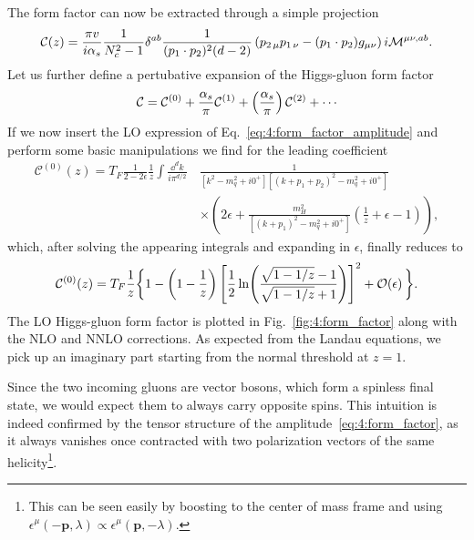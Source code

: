 The form factor can now be extracted through a simple projection
\begin{equation}
\mathcal{C}(z) = \frac{\pi v}{i \alpha_s} \frac{1}{N_c^2 - 1} \delta^{ab} \frac{1}{(p_1 \cdot p_2)^2 (d - 2)} \left(p_{2\,\mu} p_{1\,\nu} - (p_1 \cdot p_2) g_{\mu\nu} \right) i \mathcal{M}^{\mu \nu, ab}.
\end{equation}
Let us further define a pertubative expansion of the Higgs-gluon form factor
\begin{equation}
\mathcal{C} = \mathcal{C}^{(0)} + \frac{\alphas}{\pi} \mathcal{C}^{(1)} + \left( \frac{\alphas}{\pi} \right) \mathcal{C}^{(2)} + \cdots
\label{eq:4:form_factor_expansion}
\end{equation}
If we now insert the \acs{LO} expression of Eq.~\eqref{eq:4:form_factor_amplitude} and perform some basic manipulations we find for the leading coefficient
\begin{equation}
\begin{split}
\mathcal{C}^{(0)} (z) = T_F \frac{1}{2 - 2 \epsilon} \frac{1}{z} \int \frac{\dd^d k}{i \pi^{d/2}} \,&\frac{1}{[k^2 - m_q^2 + i0^+][(k + p_1 + p_2)^2 - m_q^2 + i0^+]} \\
& \times \left( 2 \epsilon + \frac{m_H^2}{[(k + p_1)^2 - m_q^2 + i0^+]} \left(\frac{1}{z} + \epsilon - 1 \right) \right),
\label{eq:4:C0_integral_form}
\end{split}
\end{equation}
which, after solving the appearing integrals and expanding in $\epsilon$, finally reduces to
\begin{equation}
\mathcal{C}^{(0)}(z) = T_F \frac{1}{z} \bigg \lbrace 1 - \left(1 - \frac{1}{z} \right) \left[ \frac{1}{2} \ln\! \left( \frac{\sqrt{1 - 1/z} - 1}{\sqrt{1 - 1/z} + 1} \right) \right]^2 + \mathcal{O}\!\left(\epsilon\right) \bigg \rbrace.
\label{eq:4:C0}
\end{equation}
The \acs{LO} Higgs-gluon form factor is plotted in Fig.~\ref{fig:4:form_factor} along with the \acs{NLO} and \acs{NNLO} corrections. As expected from the Landau equations, we pick up an imaginary part starting from the normal threshold at $z=1$.

Since the two incoming gluons are vector bosons, which form a spinless final state, we would expect them to always carry opposite spins. This intuition is indeed confirmed by the tensor structure of the amplitude~\eqref{eq:4:form_factor}, as it always vanishes once contracted with two polarization vectors of the same helicity\footnote{This can be seen easily by boosting to the center of mass frame and using $\epsilon^\mu (-\mathbf{p}, \lambda) \propto \epsilon^\mu (\mathbf{p}, -\lambda)$.}.

